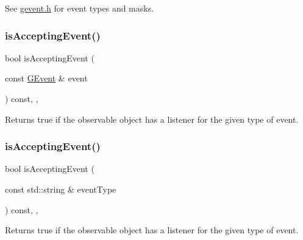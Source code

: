 See \mbox{\hyperlink{gevent_8h_source}{gevent.\+h}} for event types and masks. \mbox{\label{classGObservable_aa31c73145a29dcb92848a92e0cfaea41}} 
\subsubsection{\texorpdfstring{is\+Accepting\+Event()}{isAcceptingEvent()}\hspace{0.1cm}{\footnotesize\ttfamily [2/3]}}
{\footnotesize\ttfamily bool is\+Accepting\+Event (\begin{DoxyParamCaption}\item[{const \mbox{\hyperlink{classGEvent}{G\+Event}} \&}]{event }\end{DoxyParamCaption}) const\hspace{0.3cm}{\ttfamily [protected]}, {\ttfamily [virtual]}, {\ttfamily [inherited]}}



Returns true if the observable object has a listener for the given type of event. 

\mbox{\label{classGObservable_a3b1c689267eda44e65a2213e7de38b23}} 
\subsubsection{\texorpdfstring{is\+Accepting\+Event()}{isAcceptingEvent()}\hspace{0.1cm}{\footnotesize\ttfamily [3/3]}}
{\footnotesize\ttfamily bool is\+Accepting\+Event (\begin{DoxyParamCaption}\item[{const std\+::string \&}]{event\+Type }\end{DoxyParamCaption}) const\hspace{0.3cm}{\ttfamily [protected]}, {\ttfamily [virtual]}, {\ttfamily [inherited]}}



Returns true if the observable object has a listener for the given type of event. 

\mbox{\label{classGBrowserPane_a012b5afb54e037e6c5498cf0932a521b}} 
